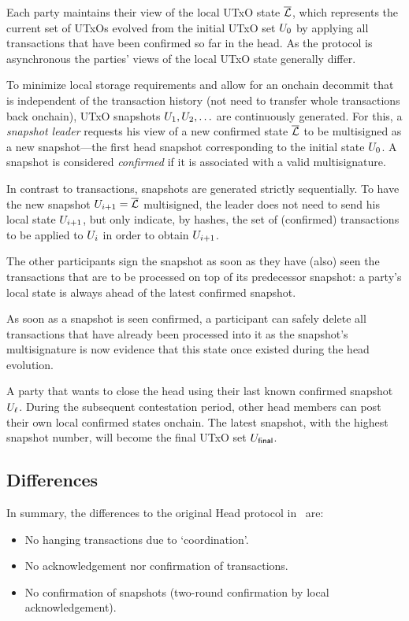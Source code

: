 Each party maintains their view of the local UTxO state $\overline {\mathcal L}$, which
represents the current set of UTxOs evolved from the initial UTxO set $U_{0}$
by applying all transactions that  have been confirmed so far in the head. As the
protocol is asynchronous the parties' views of the local UTxO state generally
differ.

 To minimize local storage requirements and allow for an
onchain decommit that is independent of the transaction history (not need to
transfer whole transactions back onchain), UTxO snapshots $U_1,U_2,\ldots$ are
continuously generated. For this, a \emph{snapshot leader} requests his view of
a new confirmed state $\overline {\mathcal L}$ to be multisigned as a new snapshot---the first
head snapshot corresponding to the initial state $U_{0}$. A snapshot is
considered \emph{confirmed} if it is associated with a valid multisignature.

In contrast to transactions, snapshots are generated strictly sequentially. To
have the new snapshot $U_{i+1}=\overline {\mathcal L}$ multisigned, the leader does not need
to send his local state $U_{i+1}$, but only indicate, by hashes, the set of
(confirmed) transactions to be applied to $U_i$ in order to obtain
$U_{i+1}$.

The other participants sign the snapshot as soon as they have (also) seen the
transactions that are to be processed on top of its predecessor snapshot: a
party's local state is always ahead of the latest confirmed snapshot.

As soon as a snapshot is seen confirmed, a participant can safely
delete all transactions that have already been processed into it as the
snapshot's multisignature is now evidence that this state once existed
during the head evolution.

 A party that wants to close the head using their last known confirmed snapshot $U_\ell$. During the subsequent contestation period, other head members can post their own local confirmed states onchain. The latest snapshot, with the highest snapshot number, will become the final UTxO set $U_{\mathsf{final}}$.

\subsection{Differences}

In summary, the differences to the original Head protocol in~\cite{hydrahead20} are:

\begin{itemize}
  \item No hanging transactions due to `coordination'.
  \item No acknowledgement nor confirmation of transactions.
  \item No confirmation of snapshots (two-round confirmation by local acknowledgement).
\end{itemize}


